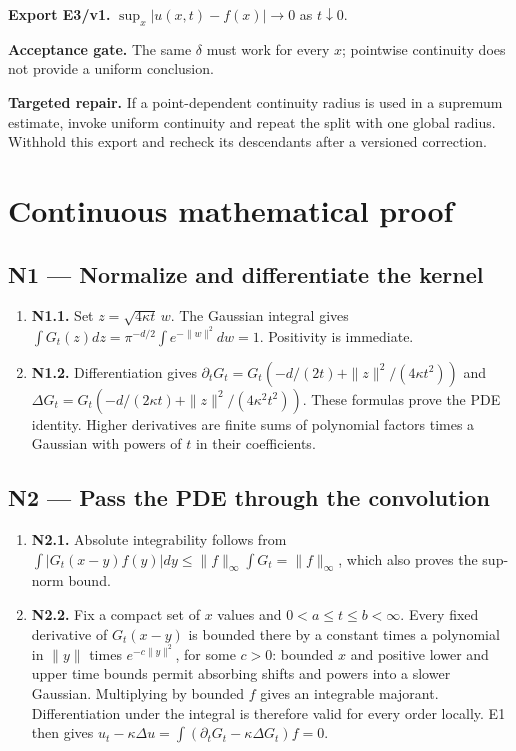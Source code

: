 \documentclass[preprint,12pt,aps,pra,showkeys,amsmath,amssymb,superscriptaddress,floatfix]{revtex4-2}
\theoremstyle{definition}
\theoremstyle{remark}
\newcommand{\field}[2]{\par\smallskip\noindent\textbf{#1.} #2\par}
\begin{document}
\field{Export E3/v1}{\(\sup_x|u(x,t)-f(x)|\to0\) as \(t\downarrow0\).}

\field{Acceptance gate}{The same \(\delta\) must work for every \(x\); pointwise continuity does
not provide a uniform conclusion.}

\field{Targeted repair}{If a point-dependent continuity radius is used in a supremum estimate,
invoke uniform continuity and repeat the split with one global radius.
Withhold this export and recheck its descendants after a versioned
correction.}

\endgroup\clearpage\section{Continuous mathematical proof}\label{sec:proof}

\subsection{N1 --- Normalize and differentiate the
kernel}\label{n1-normalize-and-differentiate-the-kernel}

\begin{enumerate}
\def\labelenumi{\arabic{enumi}.}
\item
  \textbf{N1.1.} Set \(z=\sqrt{4\kappa t}\,w\). The Gaussian integral
  gives \(\int G_t(z)dz=\pi^{-d/2}\int e^{-\|w\|^2}dw=1\). Positivity is
  immediate.
\item
  \textbf{N1.2.} Differentiation gives
  \(\partial_tG_t=G_t(-d/(2t)+\|z\|^2/(4\kappa t^2))\) and
  \(\Delta G_t=G_t(-d/(2\kappa t)+\|z\|^2/(4\kappa^2t^2))\). These
  formulas prove the PDE identity. Higher derivatives are finite sums of
  polynomial factors times a Gaussian with powers of \(t\) in their
  coefficients.
\end{enumerate}

\subsection{N2 --- Pass the PDE through the
convolution}\label{n2-pass-the-pde-through-the-convolution}

\begin{enumerate}
\def\labelenumi{\arabic{enumi}.}
\item
  \textbf{N2.1.} Absolute integrability follows from
  \(\int|G_t(x-y)f(y)|dy\le\|f\|_\infty\int G_t=\|f\|_\infty\), which
  also proves the sup-norm bound.
\item
  \textbf{N2.2.} Fix a compact set of \(x\) values and
  \(0<a\le t\le b<\infty\). Every fixed derivative of \(G_t(x-y)\) is
  bounded there by a constant times a polynomial in \(\|y\|\) times
  \(e^{-c\|y\|^2}\), for some \(c>0\): bounded \(x\) and positive lower
  and upper time bounds permit absorbing shifts and powers into a slower
  Gaussian. Multiplying by bounded \(f\) gives an integrable majorant.
  Differentiation under the integral is therefore valid for every order
  locally. E1 then gives
  \(u_t-\kappa\Delta u=\int(\partial_tG_t-\kappa\Delta G_t)f=0\).
\end{enumerate}
\end{document}
